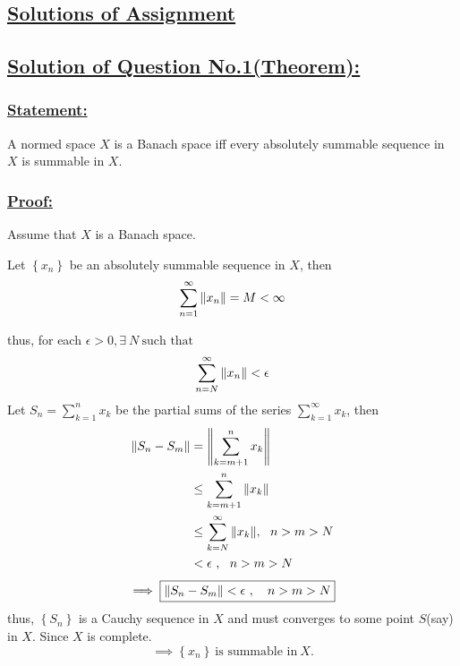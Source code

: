\documentclass[a4paper,12pt]{article}
\begin{document}
    \pagebreak

    \begin{center}
        \section*{\underline{\LARGE{{\bf Solutions of Assignment }}}}
    \end{center}

    \subsection*{\underline{Solution of Question No.1(Theorem):}}

    \subsubsection*{\underline{{\bf Statement:}}}

    A normed space $X$ is a Banach space iff every absolutely summable sequence in $X$  is summable in $X$.

    \vspace*{0.5cm}

    \subsubsection*{\underline{{\bf Proof:}}}

    Assume that $X$ is a Banach space.

    Let $\left\{x_n\right\}$ be an absolutely summable sequence in $X$, then
    \[\sum_{n=1}^{\infty}\norm{x_n} = M < \infty\]
    \begin{center}
        thus, for each $\epsilon > 0 , \exists\  N\ \mbox{such that}$
        \[\sum_{n=N}^{\infty}\norm{x_n} < \epsilon\]
        Let $S_n = \sum_{k=1}^{n}x_k$ be the partial sums of the series $\sum_{k=1}^{\infty}x_k$, then
        \begin{equation*}
            \begin{split}
                \norm{S_n - S_m} & = \norm{\sum_{k=m+1}^{n}x_k}\\
                & \leq \sum_{k=m+1}^{n}\norm{x_k}\\
                & \leq \sum_{k=N}^{\infty}\norm{x_k},\ \ n > m > N\\
                & < \epsilon\ , \ \ n > m > N
            \end{split}
        \end{equation*}
        \[\implies \boxed{\norm{S_n - S_m}  < \epsilon\ ,\ \ \ n > m > N}\]
        thus, $\left\{S_n\right\}$ is a Cauchy sequence in $X$ and must converges to some point $S$(say) in $X$.
        Since $X$ is complete.
        \[\implies \left\{x_n\right\}\ \mbox{is summable in}\ X. \]
    \end{center}
\end{document}

